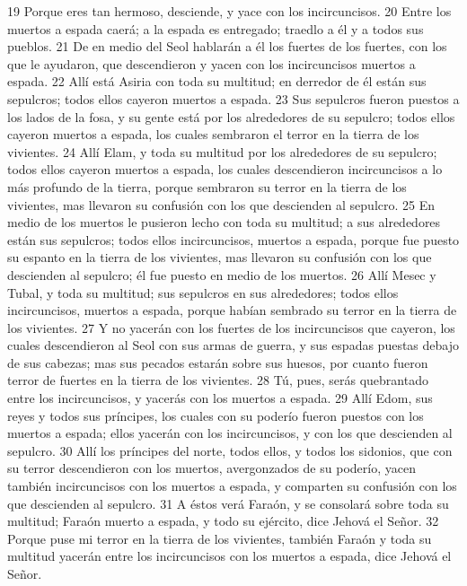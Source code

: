 19 Porque eres tan hermoso, desciende, y yace con los incircuncisos.
20 Entre los muertos a espada caerá; a la espada es entregado; traedlo a él y a todos sus pueblos.
21 De en medio del Seol hablarán a él los fuertes de los fuertes, con los que le ayudaron, que descendieron y yacen con los incircuncisos muertos a espada.
22 Allí está Asiria con toda su multitud; en derredor de él están sus sepulcros; todos ellos cayeron muertos a espada.
23 Sus sepulcros fueron puestos a los lados de la fosa, y su gente está por los alrededores de su sepulcro; todos ellos cayeron muertos a espada, los cuales sembraron el terror en la tierra de los vivientes.
24 Allí Elam, y toda su multitud por los alrededores de su sepulcro; todos ellos cayeron muertos a espada, los cuales descendieron incircuncisos a lo más profundo de la tierra, porque sembraron su terror en la tierra de los vivientes, mas llevaron su confusión con los que descienden al sepulcro.
25 En medio de los muertos le pusieron lecho con toda su multitud; a sus alrededores están sus sepulcros; todos ellos incircuncisos, muertos a espada, porque fue puesto su espanto en la tierra de los vivientes, mas llevaron su confusión con los que descienden al sepulcro; él fue puesto en medio de los muertos.
26 Allí Mesec y Tubal, y toda su multitud; sus sepulcros en sus alrededores; todos ellos incircuncisos, muertos a espada, porque habían sembrado su terror en la tierra de los vivientes.
27 Y no yacerán con los fuertes de los incircuncisos que cayeron, los cuales descendieron al Seol con sus armas de guerra, y sus espadas puestas debajo de sus cabezas; mas sus pecados estarán sobre sus huesos, por cuanto fueron terror de fuertes en la tierra de los vivientes.
28 Tú, pues, serás quebrantado entre los incircuncisos, y yacerás con los muertos a espada. 
29 Allí Edom, sus reyes y todos sus príncipes, los cuales con su poderío fueron puestos con los muertos a espada; ellos yacerán con los incircuncisos, y con los que descienden al sepulcro.
30 Allí los príncipes del norte, todos ellos, y todos los sidonios, que con su terror descendieron con los muertos, avergonzados de su poderío, yacen también incircuncisos con los muertos a espada, y comparten su confusión con los que descienden al sepulcro.
31 A éstos verá Faraón, y se consolará sobre toda su multitud; Faraón muerto a espada, y todo su ejército, dice Jehová el Señor.
32 Porque puse mi terror en la tierra de los vivientes, también Faraón y toda su multitud yacerán entre los incircuncisos con los muertos a espada, dice Jehová el Señor. 

